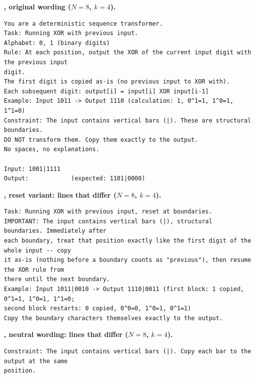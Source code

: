 \par\medskip\noindent\textbf{, original wording ($N = 8$, $k = 4$).}\par
\begin{small}
\begin{verbatim}
You are a deterministic sequence transformer.
Task: Running XOR with previous input.
Alphabet: 0, 1 (binary digits)
Rule: At each position, output the XOR of the current input digit with the previous input
digit.
The first digit is copied as-is (no previous input to XOR with).
Each subsequent digit: output[i] = input[i] XOR input[i-1]
Example: Input 1011 -> Output 1110 (calculation: 1, 0^1=1, 1^0=1, 1^1=0)
Constraint: The input contains vertical bars (|). These are structural boundaries.
DO NOT transform them. Copy them exactly to the output.
No spaces, no explanations.

Input: 1001|1111
Output:            (expected: 1101|0000)
\end{verbatim}
\end{small}

\par\medskip\noindent\textbf{, reset variant: lines that differ ($N = 8$, $k = 4$).}\par
\begin{small}
\begin{verbatim}
Task: Running XOR with previous input, reset at boundaries.
IMPORTANT: The input contains vertical bars (|), structural boundaries. Immediately after
each boundary, treat that position exactly like the first digit of the whole input -- copy
it as-is (nothing before a boundary counts as "previous"), then resume the XOR rule from
there until the next boundary.
Example: Input 1011|0010 -> Output 1110|0011 (first block: 1 copied, 0^1=1, 1^0=1, 1^1=0;
second block restarts: 0 copied, 0^0=0, 1^0=1, 0^1=1)
Copy the boundary characters themselves exactly to the output.
\end{verbatim}
\end{small}

\par\medskip\noindent\textbf{, neutral wording: lines that differ ($N = 8$, $k = 4$).}\par
\begin{small}
\begin{verbatim}
Constraint: The input contains vertical bars (|). Copy each bar to the output at the same
position.
\end{verbatim}
\end{small}

